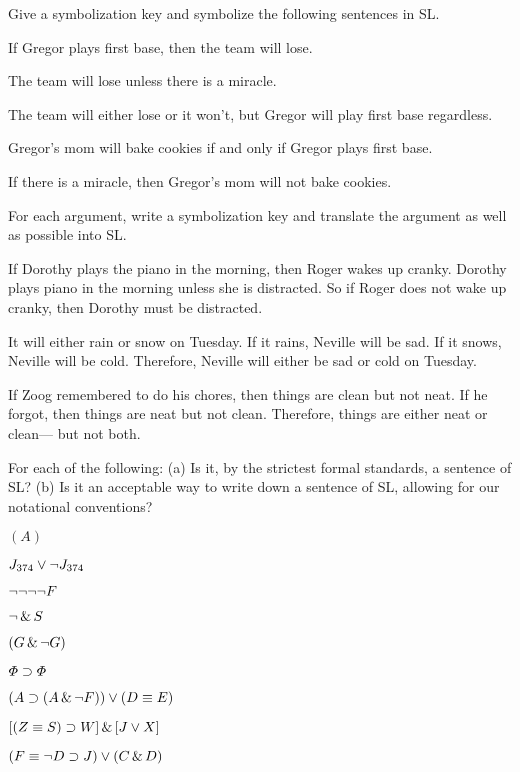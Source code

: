 \solutions
\problempart Give a symbolization key and symbolize the following sentences in SL.
\label{pr.gregorbaseball}
\begin{earg}
\item If Gregor plays first base, then the team will lose.
\item The team will lose unless there is a miracle.
\item The team will either lose or it won't, but Gregor will play first base regardless.
\item Gregor's mom will bake cookies if and only if Gregor plays first base.
\item If there is a miracle, then Gregor's mom will not bake cookies.
\end{earg}


\problempart
\label{pr.choresSL}
For each argument, write a symbolization key and translate the argument as well as possible into SL.
\begin{earg}
\item If Dorothy plays the piano in the morning, then Roger wakes up cranky. Dorothy plays piano in the morning unless she is distracted. So if Roger does not wake up cranky, then Dorothy must be distracted.
\item It will either rain or snow on Tuesday. If it rains, Neville will be sad. If it snows, Neville will be cold. Therefore, Neville will either be sad or cold on Tuesday.
\item If Zoog remembered to do his chores, then things are clean but not neat. If he forgot, then things are neat but not clean. Therefore, things are either neat or clean--- but not both.
\end{earg}



\solutions
\problempart
\label{pr.wiffSL}
For each of the following: (a) Is it, by the strictest formal standards, a sentence of SL? (b) Is it an acceptable way to write down a sentence of SL, allowing for our notational conventions?
\begin{earg}
\item $(A)$
\item $J_{374} \vee \neg J_{374}$
\item $\neg \neg \neg \neg F$
\item $\neg \,\&\, S$
\item $(G \,\&\, \neg G)$
\item $\varPhi{} \supset \varPhi{}$
\item $(A \supset (A \,\&\, \neg F)) \vee (D \equiv E)$
\item $[(Z \equiv S) \supset W] \,\&\, [J \vee X]$
\item $(F \equiv \neg D \supset J) \vee (C \,\&\, D)$
\end{earg}



